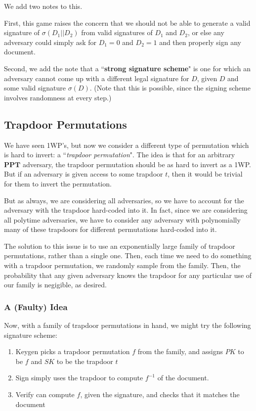 \documentclass[11pt]{article}
\newcommand{\PPT}{\mathbf{PPT}}
\begin{document}
We add two notes to this. \smallskip 

First, this game raises the concern that we should not be able to generate a valid signature of \(\sigma(D_1||D_2)\) from valid signatures of \(D_1\) and \(D_2\), or else any adversary could simply ask for \(D_1=0\) and \(D_2=1\) and then properly sign any document.\smallskip

Second, we add the note that a ``\textbf{strong signature scheme}" is one for which an adversary cannot come up with a different legal signature for \(D\), given \(D\) and some valid signature \(\sigma(D)\). (Note that this is possible, since the signing scheme involves randomness at every step.)

\subsection{Trapdoor Permutations}
We have seen 1WP's, but now we consider a different type of permutation which is hard to invert: a ``\emph{trapdoor permutation}". The idea is that for an arbitrary \(\PPT\) adversary, the trapdoor permutation should be as hard to invert as  a 1WP. But if an adversary is given access to some trapdoor \(t\), then it would be trivial for them to invert the permutation.\medskip

But as always, we are considering all adversaries, so we have to account for the adversary with the trapdoor hard-coded into it. In fact, since we are considering all polytime adversaries, we have to consider any adversary with polynomially many of these trapdoors for different permutations hard-coded into it. \smallskip

The solution to this issue is to use an exponentially large family of trapdoor permutations, rather than a single one. Then, each time we need to do something with a trapdoor permutation, we randomly sample from the family. Then, the probability that any given adversary knows the trapdoor for any particular use of our family is negigible, as desired.

\subsubsection{A (Faulty) Idea}
Now, with a family of trapdoor permutations in hand, we might try the following signature scheme:
\begin{enumerate}
\item Keygen picks a trapdoor permutation \(f\) from the family, and assigns \(PK\) to be \(f\) and \(SK\) to be the trapdoor \(t\)
\item Sign simply uses the trapdoor to compute \(f^{-1}\) of the document.
\item Verify can compute \(f\), given the signature, and checks that it matches the document
\end{enumerate}
\end{document}
